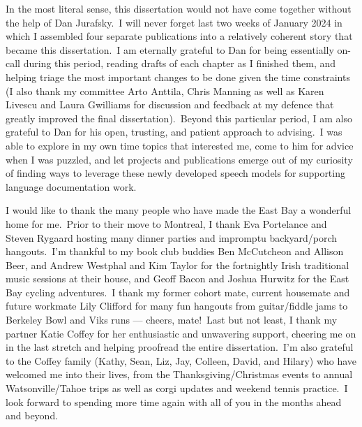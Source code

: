 \documentclass{report}
\begin{document}
In the most literal sense, this dissertation would not have come together without the help of Dan Jurafsky.~I will never forget last two weeks of January 2024 in which I assembled four separate publications into a relatively coherent story that became this dissertation.~I am eternally grateful to Dan for being essentially on-call during this period, reading drafts of each chapter as I finished them, and helping triage the most important changes to be done given the time constraints (I also thank my committee Arto Anttila, Chris Manning as well as Karen Livescu and Laura Gwilliams for discussion and feedback at my defence that greatly improved the final dissertation).~Beyond this particular period, I am also grateful to Dan for his open, trusting, and patient approach to advising.~I was able to explore in my own time topics that interested me, come to him for advice when I was puzzled, and let projects and publications emerge out of my curiosity of finding ways to leverage these newly developed speech models for supporting language documentation work. 

I would like to thank the many people who have made the East Bay a wonderful home for me.~Prior to their move to Montreal, I thank Eva Portelance and Steven Rygaard hosting many dinner parties and impromptu backyard/porch hangouts.~I'm thankful to my book club buddies Ben McCutcheon and Allison Beer, and Andrew Westphal and Kim Taylor for the fortnightly Irish traditional music sessions at their house, and Geoff Bacon and Joshua Hurwitz for the East Bay cycling adventures.~I thank my former cohort mate, current housemate and future workmate Lily Clifford for many fun hangouts from guitar/fiddle jams to Berkeley Bowl and Viks runs --- cheers, mate!~Last but not least, I thank my partner Katie Coffey for her enthusiastic and unwavering support, cheering me on in the last stretch and helping proofread the entire dissertation.~I'm also grateful to the Coffey family (Kathy, Sean, Liz, Jay, Colleen, David, and Hilary) who have welcomed me into their lives, from the Thanksgiving/Christmas events to annual Watsonville/Tahoe trips as well as corgi updates and weekend tennis practice.~I look forward to spending more time again with all of you in the months ahead and beyond.

\afterpreface








\end{document}
